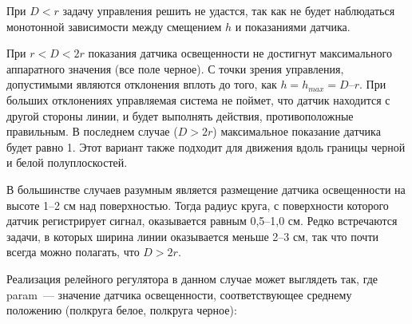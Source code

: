 При \(D<r\) задачу управления решить не удастся, так как не будет наблюдаться монотонной зависимости между смещением \(h\) и показаниями датчика. 

При \(r<D<2r\) показания датчика освещенности не достигнут максимального аппаратного значения (все поле черное). С точки зрения управления, допустимыми являются отклонения вплоть до того, как \(h=h_{max}=D–r\). При больших отклонениях управляемая система не поймет, что датчик находится с другой стороны линии, и будет выполнять действия, противоположные правильным. В последнем случае (\(D>2r\)) максимальное показание датчика будет равно 1. Этот вариант также подходит для движения вдоль границы черной и белой полуплоскостей.

В большинстве случаев разумным является размещение датчика освещенности на высоте 1--2 см над поверхностью. Тогда радиус круга, с поверхности которого датчик регистрирует сигнал, оказывается равным 0,5--1,0 см. Редко встречаются задачи, в которых ширина линии оказывается меньше 2--3 см, так что почти всегда можно полагать, что \(D>2r\).

Реализация релейного регулятора в данном случае может выглядеть так, где param~--- значение датчика освещенности, соответствующее среднему положению (полкруга белое, полкруга черное):\\\\

{\programm
	{\slshape{}}\\
	\rC{\{}\\
	\\
	\indent\rC{\{}\\
	\indent\indent{}\\
	\indent\indent{}\\
	\indent\rC{\}}\\
	\\
	\indent\rC{\{}\\
	\indent\indent{}\\
	\indent\indent{}\\
	\indent\rC{\}}\\
	\indent{}\\
	\rC{\}}\\
}\\\\

